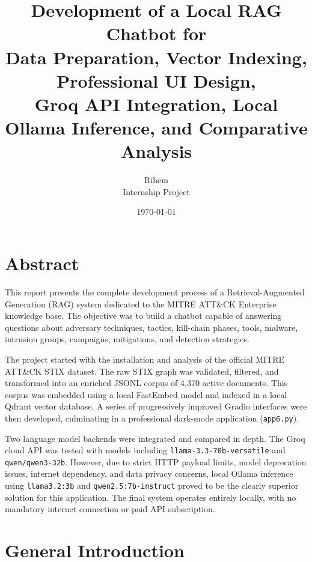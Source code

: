 \documentclass[12pt,a4paper]{report}
\title{
    \textbf{Development of a Local RAG Chatbot for \ATTACK}\\
    \large Data Preparation, Vector Indexing, Professional UI Design,\\
    Groq API Integration, Local Ollama Inference, and Comparative Analysis
}
\author{
    Rihem\\
    Internship Project
}
\date{\today}
\newcommand{\ATTACK}{MITRE ATT\&CK}
\begin{document}
\maketitle

\tableofcontents
\listoftables
\listoffigures


\chapter*{Abstract}

This report presents the complete development process of a Retrieval-Augmented Generation (RAG) system dedicated to the \ATTACK{} Enterprise knowledge base. The objective was to build a chatbot capable of answering questions about adversary techniques, tactics, kill-chain phases, tools, malware, intrusion groups, campaigns, mitigations, and detection strategies.

The project started with the installation and analysis of the official \ATTACK{} STIX dataset. The raw STIX graph was validated, filtered, and transformed into an enriched JSONL corpus of 4,370 active documents. This corpus was embedded using a local FastEmbed model and indexed in a local Qdrant vector database. A series of progressively improved Gradio interfaces were then developed, culminating in a professional dark-mode application (\texttt{app6.py}).

Two language model backends were integrated and compared in depth. The Groq cloud API was tested with models including \texttt{llama-3.3-70b-versatile} and \texttt{qwen/qwen3-32b}. However, due to strict HTTP payload limits, model deprecation issues, internet dependency, and data privacy concerns, local Ollama inference using \texttt{llama3.2:3b} and \texttt{qwen2.5:7b-instruct} proved to be the clearly superior solution for this application. The final system operates entirely locally, with no mandatory internet connection or paid API subscription.


\chapter*{General Introduction}
\end{document}
